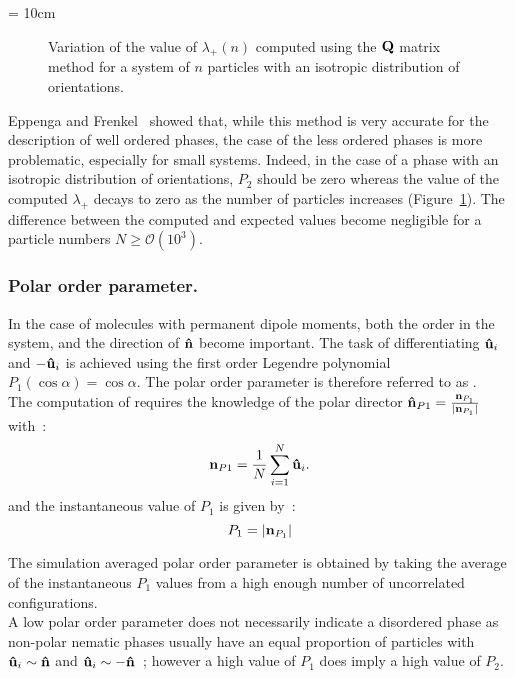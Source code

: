 \picW = 10cm
\begin{figure}
	\centering
	\caption{Variation of the value of $\lambda_+(n)$ computed using the $\mathbf{Q}$ matrix method 
	for a system of $n$ particles with an isotropic distribution of orientations.}
	\label{fig:P2(n)}
\end{figure}


Eppenga and Frenkel~\cite{EppengaFrenkel84} showed that, while this method is very accurate 
for the description  of well ordered phases, the case of the less ordered phases is 
more problematic, especially for small systems. Indeed, in the case of a phase with an isotropic 
distribution of orientations, $P_2$ should be zero whereas the value of the computed 
$\lambda_+$ decays to zero  as the number of particles increases (Figure~\ref{fig:P2(n)}). 
The difference between  the computed and expected values become negligible for a particle 
numbers $N\geq\mathcal{O}(10^3)$.
%

\subsubsection{Polar order parameter.}

In the case of molecules with permanent dipole moments, both the order in the system, and the
direction of $\mathbf{\hat{n} }$ become important. The task of differentiating $\mathbf{\hat{u} }_i$ and $-\mathbf{\hat{u} }_i$ is
achieved using the first order Legendre polynomial $P_1(\cos\alpha)=\cos\alpha$. The polar
order parameter is therefore referred to as \Pone.\\
The computation of \Pone requires the knowledge of the polar director $\mathbf{\hat{n} }_{P1} =
\frac{\mathbf{n}_{P_1}}{|\mathbf{n}_{P_1}|}$ with~:
\begin{equation}
	\mathbf{n}_{P1} = \frac{1}{N}\sum_{i=1}^N \mathbf{\hat{u} }_i.
\end{equation}
%
and the instantaneous value of $P_1$ is given by~:
\begin{equation}
	P_1 = |\mathbf{n}_{P_1}|
\end{equation}

The simulation averaged polar order parameter \Pone is obtained by taking the
average of the instantaneous $P_1$ values from a high enough number of uncorrelated
configurations.\\
A low polar order parameter does not necessarily indicate a disordered phase as non-polar
nematic phases usually have an equal proportion of particles with $\mathbf{\hat{u} }_i \sim \mathbf{\hat{n} }$ and
$\mathbf{\hat{u} }_i \sim -\mathbf{\hat{n} }$~; however a high value of $P_1$ does imply a high value of $P_2$.



